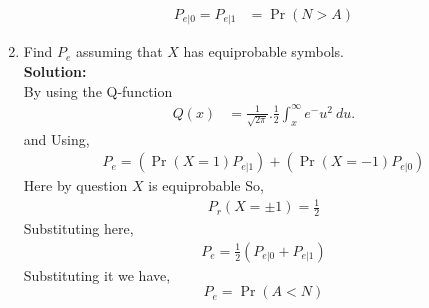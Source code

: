 \documentclass[journal,15pt,twocolumn]{IEEEtran}
\providecommand{\pr}[1]{\ensuremath{\Pr\left(#1\right)}}
\newcommand{\solution}{\noindent \textbf{Solution: }}
\begin{document}
\begin{enumerate}
\begin{align}
	 P_{e|0} = P_{e|1} &= \pr{N > A}
\end{align}
%
\item Find $P_e$ assuming that $X$ has equiprobable symbols.\\
\solution \\
By using the Q-function 
\begin{align}
	\label{eq:q_fun_ing}
	Q(x) &= \frac{1}{\sqrt{2\pi}}.\frac{1}{2} \int_x^\infty e^-u^2 \ du.
\end{align}
and Using, 
\begin{align}
	P_e = (\pr{X=1}P_{e|1}) + (\pr{X=-1}P_{e|0})
 \end{align}
	Here by question $X$ is equiprobable
    So, 
        \begin{align}
       P_r(X=\pm1) =\frac{1}{2}
        \end{align}
Substituting here,
        \begin{align}
	 P_e = \frac{1}{2} (P_{e|0} +P_{e|1})
\end{align}
Substituting it we have,
\begin{equation}
	P_e = \pr{A < N}
\end{equation}


\end{enumerate}
\end{document}
